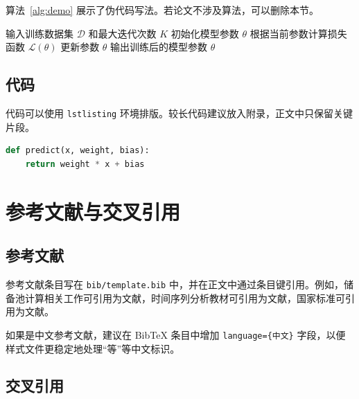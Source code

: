 \documentclass[AutoFakeBold]{LZUThesis_xb}
\begin{document}
算法~\ref{alg:demo} 展示了伪代码写法。若论文不涉及算法，可以删除本节。

\begin{algorithm}[H]
    \caption{示例算法}
    \label{alg:demo}
    \begin{algorithmic}[1]
        \State 输入训练数据集 $\mathcal{D}$ 和最大迭代次数 $K$
        \State 初始化模型参数 $\theta$
            \State 根据当前参数计算损失函数 $\mathcal{L}(\theta)$
            \State 更新参数 $\theta$
        \EndFor
        \State 输出训练后的模型参数 $\theta$
    \end{algorithmic}
\end{algorithm}

\section{代码}

代码可以使用 \verb|lstlisting| 环境排版。较长代码建议放入附录，正文中只保留关键片段。

\begin{lstlisting}[language=Python, caption={Python 代码示例}, label={lst:python-demo}]
def predict(x, weight, bias):
    return weight * x + bias
\end{lstlisting}

\chapter{参考文献与交叉引用}

\section{参考文献}

参考文献条目写在 \verb|bib/template.bib| 中，并在正文中通过条目键引用。例如，储备池计算相关工作可引用为文献，时间序列分析教材可引用为文献，国家标准可引用为文献。

如果是中文参考文献，建议在 BibTeX 条目中增加 \verb|language={中文}| 字段，以便样式文件更稳定地处理“等”等中文标识。

\section{交叉引用}
\end{document}
